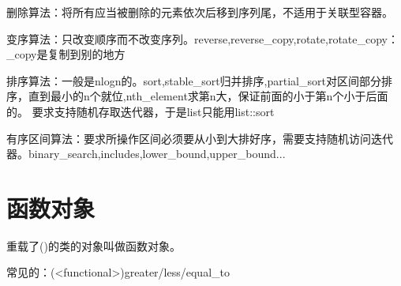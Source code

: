 \documentclass[UTF8]{ctexart}
\begin{document}
删除算法：将所有应当被删除的元素依次后移到序列尾，不适用于关联型容器。

变序算法：只改变顺序而不改变序列。reverse,reverse_copy,rotate,rotate_copy：_copy是复制到别的地方

排序算法：一般是nlogn的。sort,stable_sort归并排序,partial_sort对区间部分排序，直到最小的n个就位,nth_element求第n大，保证前面的小于第n个小于后面的。
要求支持随机存取迭代器，于是list只能用list::sort

有序区间算法：要求所操作区间必须要从小到大排好序，需要支持随机访问迭代器。binary_search,includes,lower_bound,upper_bound...

\section{函数对象}重载了()的类的对象叫做函数对象。

常见的：(<functional>)greater/less/equal_to
\end{document}
